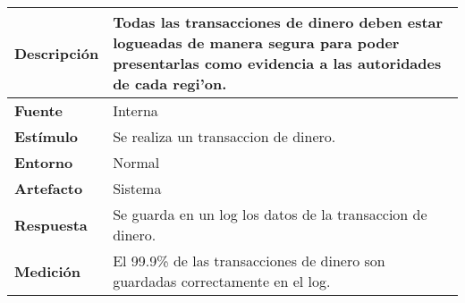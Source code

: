 \begin{center}
  \begin{tabular}{| l | p{10cm} | }
    \hline
  \textbf{Descripción} & Todas las transacciones de dinero deben estar logueadas de manera segura para poder presentarlas como evidencia a las autoridades de cada regi'on.\\  \hline
  \textbf{Fuente} & Interna\\  \hline
  \textbf{Estímulo} & Se realiza un transaccion de dinero.\\  \hline
  \textbf{Entorno} & Normal\\  \hline
  \textbf{Artefacto} & Sistema\\  \hline
  \textbf{Respuesta} & Se guarda en un log los datos de la transaccion de dinero.\\  \hline
  \textbf{Medición} & El 99.9\% de las transacciones de dinero son guardadas correctamente en el log.\\  \hline
  \end{tabular}
\end{center} 
